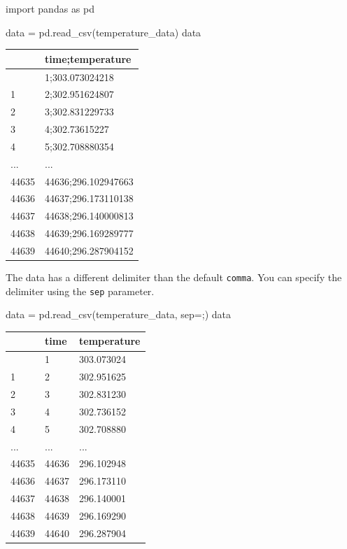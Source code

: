 \documentclass[
  letterpaper,
  DIV=11,
  numbers=noendperiod]{scrreprt}
\newenvironment{Shaded}{\begin{snugshade}}{\end{snugshade}}
\newcommand{\ImportTok}[1]{\textcolor[rgb]{0.00,0.46,0.62}{#1}}
\newcommand{\NormalTok}[1]{\textcolor[rgb]{0.00,0.23,0.31}{#1}}
\newcommand{\OperatorTok}[1]{\textcolor[rgb]{0.37,0.37,0.37}{#1}}
\newcommand{\StringTok}[1]{\textcolor[rgb]{0.13,0.47,0.30}{#1}}
\begin{document}
\begin{Shaded}
\begin{Highlighting}[]
\ImportTok{import}\NormalTok{ pandas }\ImportTok{as}\NormalTok{ pd}

\NormalTok{data }\OperatorTok{=}\NormalTok{ pd.read\_csv(temperature\_data)}
\NormalTok{data}
\end{Highlighting}
\end{Shaded}

\begin{longtable}[]{@{}ll@{}}
\toprule\noalign{}
& time;temperature \\
\midrule\noalign{}
\endhead
\bottomrule\noalign{}
\endlastfoot
0 & 1;303.073024218 \\
1 & 2;302.951624807 \\
2 & 3;302.831229733 \\
3 & 4;302.73615227 \\
4 & 5;302.708880354 \\
... & ... \\
44635 & 44636;296.102947663 \\
44636 & 44637;296.173110138 \\
44637 & 44638;296.140000813 \\
44638 & 44639;296.169289777 \\
44639 & 44640;296.287904152 \\
\end{longtable}

The data has a different delimiter than the default \texttt{comma}. You
can specify the delimiter using the \texttt{sep} parameter.

\begin{Shaded}
\begin{Highlighting}[]
\NormalTok{data }\OperatorTok{=}\NormalTok{ pd.read\_csv(temperature\_data, sep}\OperatorTok{=}\StringTok{\textquotesingle{};\textquotesingle{}}\NormalTok{)}
\NormalTok{data}
\end{Highlighting}
\end{Shaded}

\begin{longtable}[]{@{}lll@{}}
\toprule\noalign{}
& time & temperature \\
\midrule\noalign{}
\endhead
\bottomrule\noalign{}
\endlastfoot
0 & 1 & 303.073024 \\
1 & 2 & 302.951625 \\
2 & 3 & 302.831230 \\
3 & 4 & 302.736152 \\
4 & 5 & 302.708880 \\
... & ... & ... \\
44635 & 44636 & 296.102948 \\
44636 & 44637 & 296.173110 \\
44637 & 44638 & 296.140001 \\
44638 & 44639 & 296.169290 \\
44639 & 44640 & 296.287904 \\
\end{longtable}
\end{document}
